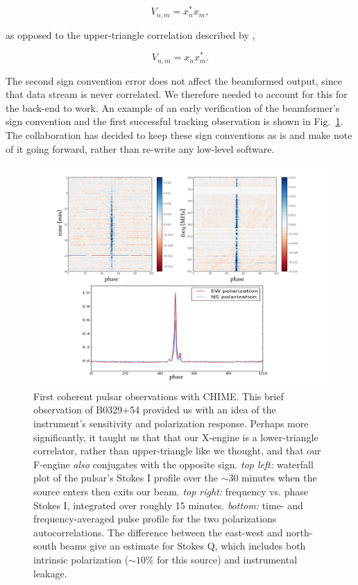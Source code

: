 \begin{equation}
V_{n, m} = x_n^* x_m,
\end{equation}

\noindent as opposed to the upper-triangle correlation described by 
\citet{2015arXiv150306203K}, 

\begin{equation}
V_{n, m} = x_n x_m^*.
\end{equation}

The second sign convention error does not affect the beamformed 
output, since that data stream is never correlated. We therefore 
needed to account for this for the back-end to work. An example 
of an early verification of the beamformer's sign convention 
and the first successful tracking observation is shown in Fig.~\ref{fig-bf_b0329}. 
The collaboration has decided to keep these sign conventions as is
and make note of it going forward, rather than re-write any low-level 
software.


\begin{figure}[!h]
\label{fig-bf_b0329}
\begin{center}
\includegraphics[trim={0.8in, 0in, 0in, 0in}, scale=0.5]{./figures/beamforming/b0329_testing.jpeg}
\caption[abc]{First coherent pulsar observations with CHIME. This 
brief observation of B0329+54 provided us with an idea 
of the instrument's sensitivity and polarization response. 
Perhaps more significantly, it taught us that 
that our X-engine is a lower-triangle correlator, rather than 
upper-triangle like we thought, and that our F-engine \textit{also}
conjugates with the opposite sign. \textit{top left:} waterfall plot
of the pulsar's Stokes I profile over the $\sim$30 minutes when the 
source enters then exits our beam. \textit{top right:} frequency 
vs. phase Stokes I, integrated over roughly 15 minutes. 
\textit{bottom:} time- and frequency-averaged pulse profile 
for the two polarizations autocorrelations. The difference between 
the east-west and north-south beams give an estimate for Stokes Q, which 
includes both intrinsic polarization ($\sim10\%$ for this source)
and instrumental leakage.} 
\vspace{0.4cm}   
\end{center}
\end{figure}


